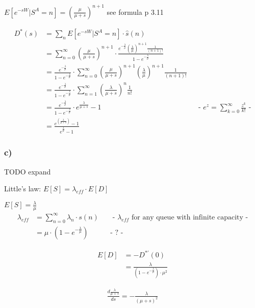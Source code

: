 $E\left[e^{{-sW}}|S^{A}=n\right]=\left(\frac{\mu }{\mu +s}\right)^{{n+1}}$ see formula p 3.11

\begin{align*}
D^{\ast }\left(s\right) &= \sum _{n}E\left[e^{{-sW}}|S^{A}=n\right]\cdot \hat{s}\left(n\right)\\
&=\sum _{{n=0}}^{\infty }\left(\frac{\mu }{\mu +s}\right)^{{n+1}}\cdot \frac{e^{{-\frac{\lambda }{\mu }}}\left(\frac{\lambda }{\mu }\right)^{{n+1}}\frac{1}{\left(n+1\right)!}}{1-e^{{-\frac{\lambda }{\mu }}}}\\
&=\frac{e^{{-\frac{\lambda }{\mu }}}}{1-e^{{-\frac{\lambda }{\mu }}}}\cdot \sum _{{n=0}}^{\infty }\left(\frac{\mu }{\mu +s}\right)^{{n+1}}\left(\frac{\lambda }{\mu }\right)^{{n+1}}\frac{1}{\left(n+1\right)!}\\
&=\frac{e^{{-\frac{\lambda }{\mu }}}}{1-e^{{-\frac{\lambda }{\mu }}}}\cdot \sum _{{n=1}}^{\infty }\left(\frac{\lambda }{\mu +s}\right)^{{n}}\frac{1}{n!}\\
&=\frac{e^{{-\frac{\lambda }{\mu }}}}{1-e^{{-\frac{\lambda }{\mu }}}} \cdot e^{{\frac{\lambda }{\mu +s}}}-1&& \text{-   $e^{{z}}=\sum _{{k=0}}^{\infty }\frac{z^{{k}}}{k!}$ -}\\
&=\frac{e^{\left(\frac{\lambda }{\mu +s}\right)}-1}{e^{{\frac{\lambda }{\mu }}}-1}
\end{align*}

\subsubsection*{ c) }

TODO expand

Little's law: $E\left[S\right]=\lambda _{{eff}}\cdot E\left[D\right]$

$E\left[S\right]=\frac{\lambda }{\mu }$
\begin{align*}
\lambda _{{eff}}&=\sum _{{n=0}}^{\infty }\lambda _{n}\cdot s\left(n\right) && \text{ - $\lambda_{eff}$ for any queue with infinite capacity -}\\
&=\mu \cdot \left(1-e^{{-\frac{\lambda }{\mu }}}\right) && \text{- ? -}
\end{align*}

\begin{align*}
E\left[D\right]&=-D^{\ast'}\left(0\right)\\
&=\frac{\lambda }{\left(1-e^{{-\frac{\lambda }{\mu }}}\right)\cdot \mu ^{2}}
\end{align*}

\begin{align*}
\frac{d \frac{\lambda }{\mu +s}}{ds}=-\frac{\lambda }{\left(\mu +s\right)^{2}}
\end{align*}

